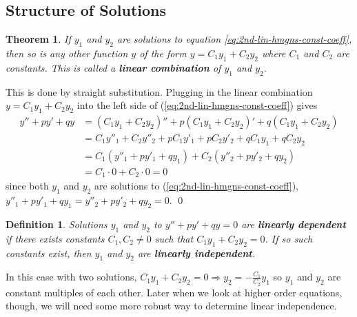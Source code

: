 \documentclass[letterpaper, 11pt, openany]{book}
\theoremstyle{mytheoremstyle}
\newtheorem{theorem}{Theorem}[section]
\newtheorem{definition}{Definition}[section]
\renewenvironment{proof}{{\par \sffamily \smaller \fontseries{b}\selectfont Proof}}{\hfill\qed}
\theoremstyle{myexamplestyle}
\begin{document}
\subsection{Structure of Solutions}

\begin{theorem}\label{t:de-2o-lin-combo-solns}
    If \(y_{1}\) and \(y_{2}\) are solutions to equation \eqref{eq:2nd-lin-hmgns-const-coeff}, then so is any other function \(y\) of the form \(y = C_{1} y_{1} + C_{2} y_{2}\) where \(C_{1}\) and \(C_{2}\) are constants. This is called a \textbf{linear combination} of \(y_{1}\) and \(y_{2}\).
\end{theorem}

\begin{proof}
    This is done by straight substitution. Plugging in the linear combination \(y = C_{1} y_{1} + C_{2} y_{2}\) into the left side of (\eqref{eq:2nd-lin-hmgns-const-coeff}) gives
    \begin{align*}
        y'' + py' + qy  &=(C_{1} y_{1} + C_{2} y_{2})'' + p(C_{1} y_{1} + C_{2} y_{2})' + q(C_{1} y_{1} + C_{2} y_{2})\\
        &=  C_{1} y''_{1} +  C_{2} y''_{2} + p C_{1} y'_{1} + p C_{2} y'_{2} + q C_{1} y_{1} + q C_{2} y_{2}\\
        &= C_{1} (y''_{1} + p y'_{1} + qy_{1}) + C_{2} (y''_{2} + p y'_{2} + qy_{2})\\
        &= C_{1} \cdot 0 + C_{2} \cdot 0 = 0
    \end{align*}
    since both \(y_{1}\) and \(y_{2}\) are solutions to (\eqref{eq:2nd-lin-hmgns-const-coeff}), \(y''_{1} + p y'_{1} + qy_{1} = y''_{2} + p y'_{2} + qy_{2} = 0\).
\end{proof}

\begin{definition}\label{d:de-linear-dependent}
    Solutions \(y_{1}\) and \(y_{2}\) to \(y'' + py' + qy = 0\) are \textbf{linearly dependent} if there exists constants \(C_{1}, C_{2} \neq 0\) such that \(C_{1} y_{1} + C_{2} y_{2} = 0\). If so such constants exist, then \(y_{1}\) and \(y_{2}\) are \textbf{linearly independent}.
\end{definition}

In this case with two solutions,  \(C_{1} y_{1} + C_{2} y_{2} = 0 \Rightarrow y_{2} = -\frac{C_{1}}{C_{2}} y_{1}\) so \(y_{1}\) and \(y_{2}\) are constant multiples of each other. Later when we look at higher order equations, though, we will need some more robust way to determine linear independence.
\end{document}
